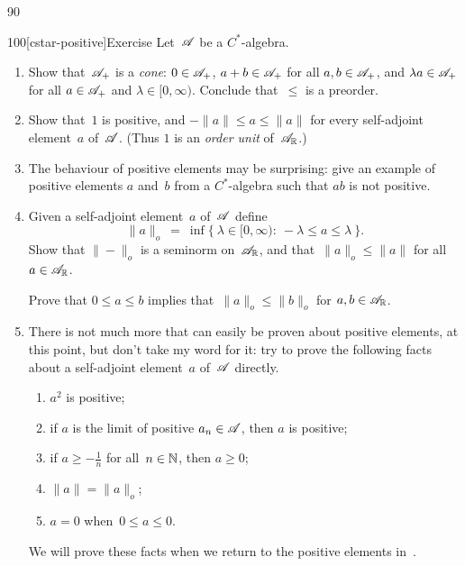 \begin{parsec}{90}
\begin{point}{100}[cstar-positive]{Exercise}%
Let~$\mathscr{A}$ be a $C^*$-algebra.
\begin{enumerate}
\item
Show that~$\mathscr{A}_{+}$ is a \emph{cone}:
$0\in \mathscr{A}_{+}$,
$a+b\in \mathscr{A}_{+}$ for all $a,b\in\mathscr{A}_{+}$,
and
$\lambda a\in \mathscr{A}_{+}$  
for all $a\in \mathscr{A}_{+}$ and $\lambda\in [0,\infty)$.
Conclude that~$\leq$ is a preorder.
\item
Show that~$1$ is positive, and  $-\|a\|\leq a \leq \|a\|$
for every self-adjoint element~$a$ of~$\mathscr{A}$.
(Thus $1$ is an \emph{order unit} of~$\mathscr{A}_{\mathbb{R}}$.)
\item
The behaviour of positive elements may be surprising:
give an example of positive elements $a$ and~$b$
from a $C^*$-algebra
such that $ab$ is not positive.
\item
Given a self-adjoint element~$a$ of~$\mathscr{A}$ define
\begin{equation*}
\|a\|_o \ = \ \inf\{\ \lambda\in[0,\infty)\colon \ 
-\lambda\leq a\leq \lambda\ \}.
\end{equation*}
Show that $\|-\|_o$ is a seminorm on~$\mathscr{A}_{\mathbb{R}}$,
and that~$\|a\|_o\leq \|a\|$
for all~$a\in\mathscr{A}_{\mathbb{R}}$.

Prove that $0\leq a\leq b$ implies that~$\|a\|_o\leq\|b\|_o$
for $a,b\in\mathscr{A}_{\mathbb{R}}$.

\item
There is not much more that can easily be
proven about positive elements, at this point,
but don't take my word for it:
try to prove the following facts
about a self-adjoint element~$a$ of~$\mathscr{A}$ directly.
\begin{enumerate}
\item $a^2$ is positive;
\item if $a$ is the limit of positive $a_n\in\mathscr{A}$,
then $a$ is positive;
\item if $a\geq -\frac{1}{n}$ for all~$n\in \mathbb{N}$, then $a\geq 0$;
\item  $\|a\|=\|a\|_o$;
\item $a=0$ when~$0\leq a\leq 0$.
\end{enumerate}
We will prove these facts
when we return to the positive elements in~.
\end{enumerate}%
\spacingfix{}%
\end{point}%
\end{parsec}%
